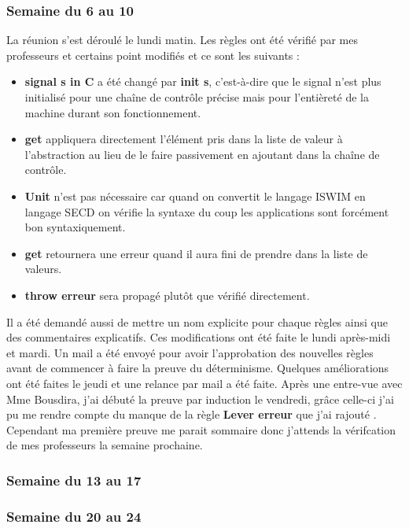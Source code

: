 \documentclass[10pt,a4paper]{article}
\begin{document}
		\subsubsection{Semaine du 6 au 10}
		
		La réunion s'est déroulé le lundi matin. Les règles ont été vérifié par mes professeurs et certains point modifiés et ce sont les suivants :
		\begin{itemize}
			\item \textbf{signal s in C} a été changé par \textbf{init s}, c'est-à-dire que le signal n'est plus initialisé pour une chaîne de contrôle précise mais pour l'entièreté de la machine durant son fonctionnement.
			\item \textbf{get} appliquera directement l'élément pris dans la liste de valeur à l'abstraction au lieu de le faire passivement en ajoutant dans la chaîne de contrôle.
			\item \textbf{Unit} n'est pas nécessaire car quand on convertit le langage ISWIM en langage SECD on vérifie la syntaxe du coup les applications sont forcément bon syntaxiquement.
			\item \textbf{get} retournera une erreur quand il aura fini de prendre dans la liste de valeurs.
			\item \textbf{throw erreur} sera propagé plutôt que vérifié directement.
		\end{itemize}
		\medbreak
		Il a été demandé aussi de mettre un nom explicite pour chaque règles ainsi que des commentaires explicatifs. 
		\smallbreak
		Ces modifications ont été faite le lundi après-midi et mardi. Un mail a été envoyé pour avoir l'approbation des nouvelles règles avant de commencer à faire la preuve du déterminisme. Quelques améliorations ont été faites le jeudi et une relance par mail a été faite.
		\medbreak
		Après une entre-vue avec Mme Bousdira, j'ai débuté la preuve par induction le vendredi, grâce celle-ci j'ai pu me rendre compte du manque de la règle \textbf{Lever erreur} que j'ai rajouté . Cependant ma première preuve me parait sommaire donc j'attends la vérifcation de mes professeurs la semaine prochaine. 
		
		\subsubsection{Semaine du 13 au 17}
		
		\subsubsection{Semaine du 20 au 24}
	\newpage
	
\end{document}
